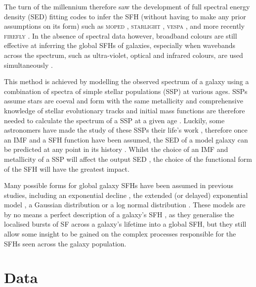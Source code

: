 The turn of the millennium therefore saw the development of full spectral energy density (SED) fitting codes to infer the SFH (without having to make any prior assumptions on its form) such as \textsc{moped} \citep{heavens00}, \textsc{starlight} \citep{cidfernandes05}, \textsc{vespa} \citep{tojeiro07}, and more recently \textsc{firefly} \citep{wilkinson15}. In the absence of spectral data however, broadband colours are still effective at inferring the global SFHs of galaxies, especially when wavebands across the spectrum, such as ultra-violet, optical and infrared colours, are used simultaneously \citep{madau98}. 

This method is achieved by modelling the observed spectrum of a galaxy using a combination of spectra of simple stellar populations (SSP) at various ages. SSPs assume stars are coeval and form with the same metallicity and comprehensive knowledge of stellar evolutionary tracks and initial mass functions \citep[IMF;][]{salpeter55, chabrier03} are therefore needed to calculate the spectrum of a SSP at a given age \citep{chen10, kriek10}. Luckily, some astronomers have made the study of these SSPs their life's work \citep[for example]{BC03, Maraston05, vazquez05, CGW09}, therefore once an IMF and a SFH function have been assumed, the SED of a model galaxy can be predicted at any point in its history \citep{chen10}. Whilst the choice of an IMF and metallicity of a SSP will affect the output SED \citep{CGW09, kriek10}, the choice of the functional form of the SFH will have the greatest impact. 

Many possible forms for global galaxy SFHs have been assumed in previous studies, including an exponential decline \citep{tinsley72, gavazzi02, weiner06, Martin07, noeske07, kriek10,  schawinski14, hart16}, the extended (or delayed) exponential model \citep{gavazzi02, oemler13, simha14}, a Gaussian distribution \citep{feuillet16} or a log normal distribution \citep{gladders13, abramson16}. These models are by no means a perfect description of a galaxy's SFH \citep{lee10, boquien14, smith15}, as they generalise the localised bursts of SF across a galaxy's lifetime into a global SFH, but they still allow some insight to be gained on the complex processes responsible for the SFHs seen across the galaxy population. 

\section{Data}\label{sec:data}

